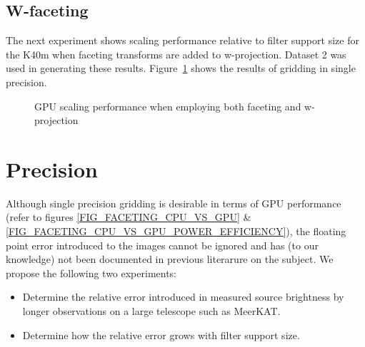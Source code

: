 \subsection{W-faceting}
The next experiment shows scaling performance relative to filter support size for the K40m 
when faceting transforms are added to w-projection. Dataset 2 was used in generating
these results. Figure~\ref{FIG_WFACETING} shows the results of gridding in
single precision.
\begin{figure}[ht!]
 \begin{mdframed}
 \centering
  \caption{GPU scaling performance when employing both faceting and w-projection}
  \label{FIG_WFACETING}
  \end{mdframed}
\end{figure}
\section{Precision}
\label{ch_sec_results}
Although single precision gridding is desirable in terms of GPU performance (refer to figures \ref{FIG_FACETING_CPU_VS_GPU} \& \ref{FIG_FACETING_CPU_VS_GPU_POWER_EFFICIENCY}), the floating 
point error introduced to the images cannot be ignored and has (to our knowledge) not been documented in previous literarure on the subject. We propose the 
following two experiments:
\begin{itemize}
 \item Determine the relative error introduced in measured source brightness by longer observations on a large telescope such as MeerKAT.
 \item Determine how the relative error grows with filter support size.
\end{itemize}

